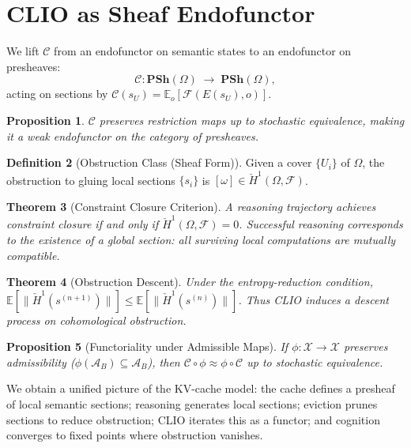 \documentclass[11pt, letterpaper]{article}
\theoremstyle{plain}
\newtheorem{theorem}{Theorem}[section]
\newtheorem{proposition}[theorem]{Proposition}
\theoremstyle{definition}
\newtheorem{definition}[theorem]{Definition}
\theoremstyle{remark}
\newcommand{\CC}{\mathcal{C}}
\newcommand{\FF}{\mathcal{F}}
\newcommand{\Adm}{\mathcal{A}}
\newcommand{\PSh}{\mathbf{PSh}}
\begin{document}
\section{CLIO as Sheaf Endofunctor}

We lift $\CC$ from an endofunctor on semantic states to an endofunctor on presheaves:
\[
  \CC : \PSh(\Omega) \;\longrightarrow\; \PSh(\Omega),
\]
acting on sections by $\CC(s_U) = \mathbb{E}_o[\mathcal{F}(E(s_U), o)]$.

\begin{proposition}
$\CC$ preserves restriction maps up to stochastic equivalence, making it a weak
endofunctor on the category of presheaves.
\end{proposition}

\begin{definition}[Obstruction Class (Sheaf Form)]
Given a cover $\{U_i\}$ of $\Omega$, the obstruction to gluing local sections $\{s_i\}$
is $[\omega] \in \check{H}^1(\Omega, \FF)$.
\end{definition}

\begin{theorem}[Constraint Closure Criterion]
\label{thm:closurecrit}
A reasoning trajectory achieves constraint closure if and only if
$\check{H}^1(\Omega, \FF) = 0$.
Successful reasoning corresponds to the existence of a global section: all surviving
local computations are mutually compatible.
\end{theorem}

\begin{theorem}[Obstruction Descent]
\label{thm:obsdescent}
Under the entropy-reduction condition,
$\mathbb{E}[\|\check{H}^1(s^{(n+1)})\|] \leq \mathbb{E}[\|\check{H}^1(s^{(n)})\|]$.
Thus CLIO induces a descent process on cohomological obstruction.
\end{theorem}

\begin{proposition}[Functoriality under Admissible Maps]
If $\phi: \mathcal{X} \to \mathcal{X}$ preserves admissibility
($\phi(\Adm_B) \subseteq \Adm_B$), then
$\CC \circ \phi \approx \phi \circ \CC$
up to stochastic equivalence.
\end{proposition}

We obtain a unified picture of the KV-cache model: the cache defines a presheaf of
local semantic sections; reasoning generates local sections; eviction prunes sections
to reduce obstruction; CLIO iterates this as a functor; and cognition converges to
fixed points where obstruction vanishes.
\end{document}
